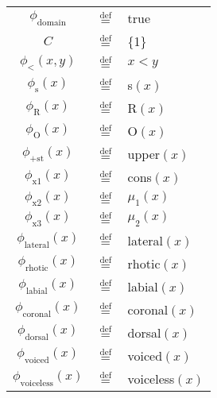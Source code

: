 \newcommand{\defeq}{\stackrel{\text{def}}{=}}

\begin{center}
	\renewcommand{\arraystretch}{1.2}
	\begin{tabular}{|ccl|}
		\hline
		$\phi_{\text{domain}}$ & $\defeq$ & true \\
		$C$ & $\defeq$ & \{1\} \\
		\hline
		$\phi_{<}(x,y)$ & $\defeq$ & $x < y$ \\
		\hline
		$\phi_{\text{s}}(x)$ & $\defeq$ & s$(x)$ \\
		$\phi_{\text{R}}(x)$ & $\defeq$ & R$(x)$ \\
		$\phi_{\text{O}}(x)$ & $\defeq$ & O$(x)$ \\
		$\phi_{\text{+st}}(x)$ & $\defeq$ & upper$(x)$ \\
		\hline
		$\phi_{\text{x1}}(x)$ & $\defeq$ & cons$(x)$ \\
		$\phi_{\text{x2}}(x)$ & $\defeq$ & $\mu_1(x)$ \\
		$\phi_{\text{x3}}(x)$ & $\defeq$ & $\mu_2(x)$ \\
		$\phi_{\text{lateral}}(x)$ & $\defeq$ & lateral$(x)$ \\
		$\phi_{\text{rhotic}}(x)$ & $\defeq$ & rhotic$(x)$ \\
		\hline
		$\phi_{\text{labial}}(x)$ & $\defeq$ & labial$(x)$ \\
		$\phi_{\text{coronal}}(x)$ & $\defeq$ & coronal$(x)$ \\
		$\phi_{\text{dorsal}}(x)$ & $\defeq$ & dorsal$(x)$ \\
		\hline
		$\phi_{\text{voiced}}(x)$ & $\defeq$ & voiced$(x)$ \\
		$\phi_{\text{voiceless}}(x)$ & $\defeq$ & voiceless$(x)$ \\
		\hline
	\end{tabular}
\end{center}